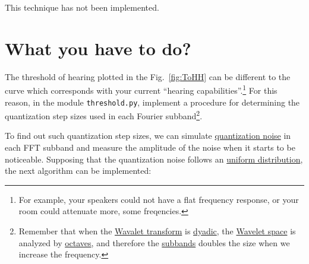 This technique has not been implemented.

\section{What you have to do?}


The threshold of hearing plotted in the Fig.~\ref{fig:ToHH} can be
different to the curve which corresponds with your current ``hearing
capabilities''.\footnote{For example, your speakers could not have a
  flat frequency response, or your room could attenuate more, some
  freqencies.} For this reason, in the module \verb|threshold.py|,
implement a procedure for determining the quantization step sizes used in
each Fourier subband\footnote{Remember that when the
  \href{https://en.wikipedia.org/wiki/Wavelet_transform}{Wavalet
    transform} is
  \href{https://en.wikipedia.org/wiki/Dyadic_rational}{dyadic}, the
  \href{https://en.wikipedia.org/wiki/Discrete_wavelet_transform}{Wavelet
    space} is analyzed by
  \href{https://en.wikipedia.org/wiki/Octave_band}{octaves}, and
  therefore the
  \href{https://en.wikipedia.org/wiki/Filter_bank}{subbands} doubles
  the size when we increase the frequency.}.
  
To find out such quantization step sizes, we can simulate
\href{https://en.wikipedia.org/wiki/Quantization_(signal_processing)}{quantization
  noise} in each FFT subband and measure the amplitude of the noise when
it starts to be noticeable. Supposing that the quantization noise
follows an
\href{https://en.wikipedia.org/wiki/Continuous_uniform_distribution}{uniform
  distribution}, the next algorithm can be implemented:

